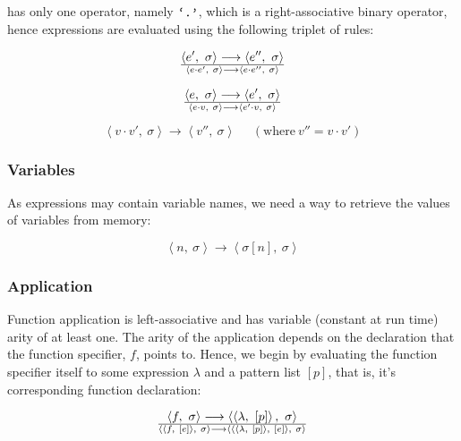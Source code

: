  has only one operator, namely $\text{{\ttfamily`.'}}$, which is a right-associative
binary operator, hence expressions are evaluated using the following triplet of
rules:

\begin{equation}
{
\left\langle e',\ \sigma\right\rangle
\longrightarrow
\left\langle e'',\ \sigma\right\rangle
}\over {
\left\langle e \cdot e',\ \sigma\right\rangle
\longrightarrow
\left\langle e \cdot e'',\ \sigma\right\rangle
}
\end{equation}

\begin{equation}
{
\left\langle e,\ \sigma\right\rangle
\longrightarrow
\left\langle e',\ \sigma\right\rangle
}\over {
\left\langle e\cdot v,\ \sigma\right\rangle
\longrightarrow
\left\langle e' \cdot v,\ \sigma\right\rangle
}
\end{equation}

\begin{equation}
\left\langle v \cdot v',\ \sigma\right\rangle
\longrightarrow
\left\langle v'',\ \sigma\right\rangle
\ \ \ \ \ \ (\text{where}\ v'' = v \cdot v')
\end{equation}

\subsubsection{Variables}

As expressions may contain variable names, we need a way to retrieve the values
of variables from memory:

\begin{equation}
\left\langle n,\ \sigma\right\rangle
\longrightarrow
\left\langle \sigma[n],\ \sigma\right\rangle
\end{equation}

\subsubsection{Application}

Function application is left-associative and has variable (constant at run
time) arity of at least one. The arity of the application depends on the
declaration that the function specifier, $f$, points to. Hence, we begin by
evaluating the function specifier itself to some expression $\lambda$ and a
pattern list $[p]$, that is, it's corresponding function declaration:

\begin{equation}
{
\left\langle f,\ \sigma\right\rangle
\longrightarrow
\left\langle \left\langle \lambda,\ [p]\right\rangle,\ \sigma\right\rangle
}\over{
\left\langle \left\langle f,\ [e]\right\rangle,\ \sigma\right\rangle
\longrightarrow
\left\langle
\left\langle\left\langle \lambda,\ [p]\right\rangle,\ [e]\right\rangle
,\ \sigma\right\rangle
}
\end{equation}

